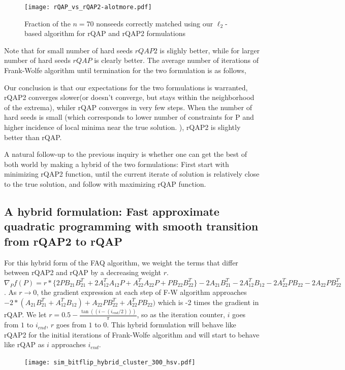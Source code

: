 \documentclass[12pt,oneside,final]{thesis}\usepackage[]{graphicx}\usepackage[]{color}
\begin{document}
\begin{figure}
 \centering
  \caption{Fraction of the $n=70$ nonseeds correctly matched using our $\ell_2$-based algorithm for rQAP and rQAP2 formulations
 \label{figell2}}
 \texttt{[image: rQAP\_vs\_rQAP2-alotmore.pdf]}
\end{figure}
Note that for small number of hard seeds $rQAP2$ is slighly better, while for larger number of hard seeds $rQAP$ is clearly better. The average number of iterations of Frank-Wolfe algorithm until termination for the two formulation is as follows,

Our conclusion is that our expectations for the two formulations is warranted, rQAP2   converges slower(or doesn't converge, but stays within the neighborhood of the extrema), whiler rQAP converges in very few steps. When the number of hard seeds is small (which corresponds to lower number of constraints for P and higher incidence of local minima near the true solution. ), rQAP2 is slightly better than rQAP.


A natural follow-up to the previous inquiry is whether one can get the best of both world by making a hybrid of the two formulations: First start with minimizing rQAP2 function, until the current iterate of solution is relatively close to the true solution, and follow with maximizing rQAP function. 


\subsection{A hybrid formulation: Fast approximate quadratic programming with smooth transition from rQAP2 to rQAP \label{subsec:hybrid}}

For this hybrid form of the FAQ algorithm, we weight the terms that differ between rQAP2 and rQAP by a decreasing weight $r$. $\nabla_{P}f(P)=
r*\{2PB_{21}B_{21}^{T}
+2A_{12}^{T}A_{12}P
+A_{22}^{T}A_{22}P
+PB_{22}B_{22}^{T}\}
-2A_{21}B_{21}^{T}-2A_{12}^{T}B_{12}
-2A_{22}^{T}PB_{22}-2A_{22}PB_{22}^{T}$. As $r \rightarrow 0 $, the gradient expression at each step of F-W algorithm approaches
$-2*(A_{21}B_{21}^T+A_{12}^TB_{12})+A_{22}PB_{22}^T+A_{22}^TPB_{22})$ which is -2 times the gradient in rQAP. We let $r= 0.5- \frac{\tan((i-(i_{end}/2)))}{\pi}$, so as the iteration counter, $i$ goes from $1$ to $i_{end}$, $r$ goes from $1$ to $0$. This hybrid formulation will behave like rQAP2 for the initial iterations of Frank-Wolfe algorithm and will start to behave like rQAP as $i$ approaches $i_{end}$.


\begin{figure}
 \centering
  \caption{
 \label{fig:hybrid}}
 \texttt{[image: sim\_bitflip\_hybrid\_cluster\_300\_hsv.pdf]}
\end{figure}
\end{document}
